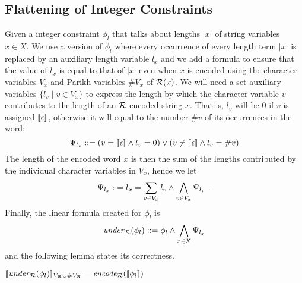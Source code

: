 \documentclass[sigplan,review,anonymous]{acmart}\settopmatter{printfolios=true,printccs=false,printacmref=false}
\begin{document}
\subsection{Flattening of Integer Constraints}
{
\newcommand{\lx}{l_x}
\newcommand{\lv}{l_v}
Given a integer constraint $\phi_l$ that talks about lengths $|x|$ of string variables $x\in X$. 
We use a version of $\phi_l$ where every occurrence of every length term $|x|$ is replaced by an auxiliary length variable $\lx$ and we add a formula to ensure that the value of $\lx$ is equal to that of $|x|$ even when $x$ is encoded using the character variables $V_x$ and Parikh variables $\# V_x$ of $\mathcal{R}(x)$.
%
We will need a set auxiliary variables $\{l_v\mid v\in V_x\}$ to express the length by which the character variable $v$ contributes to the length of an $\mathcal{R}$-encoded string $x$. 
That is, $\lv$ will be $0$ if $v$ is assigned $[\![\epsilon]\!]$,
otherwise it will equal to the number $\#v$ of its occurrences in the word:
$$
\Psi_{\lv} \defeq (v = \noepsilon \land l_v=0) \lor (v \neq \noepsilon \land l_v = \# v)
$$
The length of the encoded word $x$ is then the sum of the lengths contributed by the individual character variables in $V_x$, 
hence we let 
$$
\Psi_{\lx} \defeq \lx = \sum_{v\in V_x} l_v \land  \bigwedge_{v\in V_x} \Psi_{\lv}\ .
$$
Finally, the linear formula created for $\phi_l$ is 
$$
\underf \dr {\phi_{l}} \defeq \phi_l \land \bigwedge_{x\in X} \Psi_{\lx}
$$
and the following lemma states its correctness.
}
\begin{lemma}\label{lemma:eqcorrect}
$[\![\mathit{under}_{\mathcal{R}}(\phi_l)]\!]_{V_{\mathcal{R}}  \cup \#V_{\mathcal{R}}} = \mathit{encode}_{\mathcal{R}} ([\![\phi_l]\!])$
\end{lemma}

\end{document}
